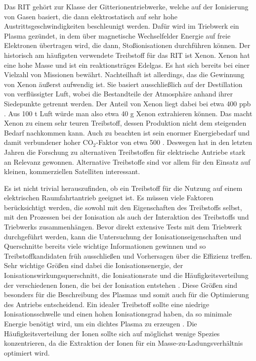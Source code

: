 Das RIT gehört zur Klasse der Gitterionentriebwerke, welche auf der Ionisierung von Gasen basiert, die dann elektrostatisch auf sehr hohe Austrittsgeschwindigkeiten beschleunigt werden. Dafür wird im Triebwerk ein Plasma gezündet, in dem über magnetische Wechselfelder Energie auf freie Elektronen übertragen wird, die dann, Stoßionisationen durchführen können. Der historisch am häufigsten verwendete Treibstoff für das RIT ist Xenon. Xenon hat eine hohe Masse und ist ein reaktionsträges Edelgas. Es hat sich bereits bei einer Vielzahl von Missionen bewährt. Nachteilhaft ist allerdings, das die Gewinnung von Xenon äußerst aufwendig ist. Sie basiert ausschließlich auf der Destillation von verflüssigter Luft, wobei die Bestandteile der Atmosphäre anhand ihrer Siedepunkte getrennt werden. Der Anteil von Xenon liegt dabei bei etwa 400 ppb \cite{Xenon}. Aus 100 t Luft würde man also etwa 40 g Xenon extrahieren können. Das macht Xenon zu einem sehr teuren Treibstoff, dessen Produktion nicht dem steigenden Bedarf nachkommen kann. Auch zu beachten ist sein enormer Energiebedarf und damit verbundener hoher CO$_2$-Faktor von etwa 500 \cite{CO2}. Deswegen hat in den letzten Jahren die Forschung zu alternativen Treibstoffen für elektrische Antriebe stark an Relevanz gewonnen. Alternative Treibstoffe sind vor allem für den Einsatz auf kleinen, kommerziellen Satelliten interessant. 

Es ist nicht trivial herauszufinden, ob ein Treibstoff für die Nutzung auf einem elektrischen Raumfahrtantrieb geeignet ist. Es müssen viele Faktoren berücksichtigt werden, die sowohl mit den Eigenschaften des Treibstoffs selbst, mit den Prozessen bei der Ionisation als auch der Interaktion des Treibstoffs und Triebwerks zusammenhängen. Bevor direkt extensive Tests mit dem Triebwerk durchgeführt werden, kann die Untersuchung der Ionisationseigenschaften und Querschnitte bereits viele wichtige Informationen gewinnen und so Treibstoffkandidaten früh ausschließen und Vorhersagen über die Effizienz treffen. Sehr wichtige Größen sind dabei die Ionisationsenergie, der Ionisationswirkungsquerschnitt, die Ionisationsrate und die Häufigkeitsverteilung der verschiedenen Ionen, die bei der Ionisation entstehen \cite{ion}. Diese Größen sind besonders für die Beschreibung des Plasmas und somit auch für die Optimierung des Antriebs entscheidend. Ein idealer Treibstoff sollte eine niedrige Ionisationsschwelle und einen hohen Ionisationsgrad haben, da so minimale Energie benötigt wird, um ein dichtes Plasma zu erzeugen \cite{Prop}. Die Häufigkeitsverteilung der Ionen sollte sich auf möglichst wenige Spezies konzentrieren, da die Extraktion der Ionen für ein Masse-zu-Ladungsverhältnis optimiert wird.


